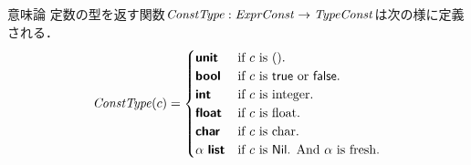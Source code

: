 \documentclass[a4paper,titlepage,report]{jsbook}
\begin{document}
\begin{resbonsiblesection}{意味論}{\sakamoto}
定数の型を返す関数$\mathit{ConstType}:\mathit{ExprConst}\rightarrow\mathit{TypeConst}$は次の様に定義される．
\begin{equation}\label{eq:func-const-type} 
    \mathit{ConstType}(c) = \begin{cases}
        \text{\sffamily\bfseries unit} & \text{if $c$ is $\mathop{\mathsf{()}}$.} \\
        \text{\sffamily\bfseries bool} & \text{if $c$ is $\mathop{\mathsf{true}}$ or $\mathop{\mathsf{false}}$.} \\
        \text{\sffamily\bfseries int} & \text{if $c$ is integer.} \\
        \text{\sffamily\bfseries float} & \text{if $c$ is float.} \\
        \text{\sffamily\bfseries char} & \text{if $c$ is char.} \\
        \alpha\ \text{\sffamily\bfseries list} & \text{if $c$ is $\mathop{\mathsf{Nil}}$. And $\alpha$ is fresh.}
        \end{cases}
\end{equation}


\end{resbonsiblesection}
\end{document}

